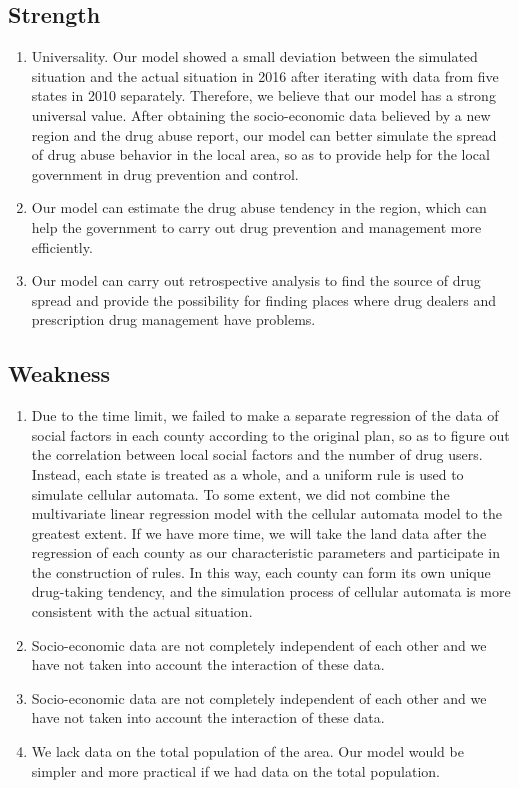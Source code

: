 \documentclass{mcmthesis}
\begin{document}
\subsection{Strength}

\begin{enumerate}
\item Universality. Our model showed a small deviation between the simulated situation and the actual situation in 2016 after iterating with data from five states in 2010 separately. Therefore, we believe that our model has a strong universal value. After obtaining the socio-economic data believed by a new region and the drug abuse report, our model can better simulate the spread of drug abuse behavior in the local area, so as to provide help for the local government in drug prevention and control.
\item Our model can estimate the drug abuse tendency in the region, which can help the government to carry out drug prevention and management more efficiently.
\item Our model can carry out retrospective analysis to find the source of drug spread and provide the possibility for finding places where drug dealers and prescription drug management have problems.
\end{enumerate}

\subsection{Weakness} 
\begin{enumerate}
\item Due to the time limit, we failed to make a separate regression of the data of social factors in each county according to the original plan, so as to figure out the correlation between local social factors and the number of drug users. Instead, each state is treated as a whole, and a uniform rule is used to simulate cellular automata. To some extent, we did not combine the multivariate linear regression model with the cellular automata model to the greatest extent. If we have more time, we will take the land data after the regression of each county as our characteristic parameters and participate in the construction of rules. In this way, each county can form its own unique drug-taking tendency, and the simulation process of cellular automata is more consistent with the actual situation.
\item Socio-economic data are not completely independent of each other and we have not taken into account the interaction of these data.
\item Socio-economic data are not completely independent of each other and we have not taken into account the interaction of these data.
\item We lack data on the total population of the area. Our model would be simpler and more practical if we had data on the total population.
\end{enumerate}
\end{document}
